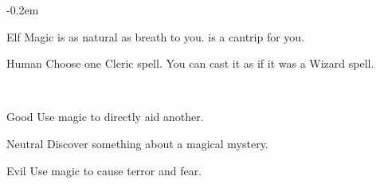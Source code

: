 \documentclass[8pt]{extarticle}
\begin{document}
\openup -0.2em

\charbanner

\begin{minipage}[t]{3.2in}

\begin{optfeature}{Elf}
  Magic is as natural as breath to you.  is a
  cantrip for you.
\end{optfeature}

\begin{optfeature}{Human}
  Choose one Cleric spell. You can cast it as if it was a Wizard
  spell.
\end{optfeature}

\ 


\begin{optfeature}{Good}
  Use magic to directly aid another.
\end{optfeature}

\begin{optfeature}{Neutral}
  Discover something about a magical mystery.
\end{optfeature}

\begin{optfeature}{Evil}
  Use magic to cause terror and fear.
\end{optfeature}

\ 



\vfill\null
\end{minipage}
\end{document}
